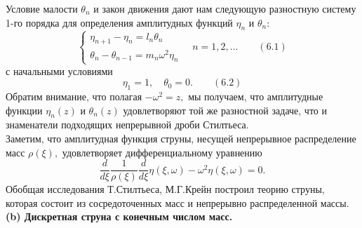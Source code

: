 \documentclass[12 pt, a4 paper]{article}
\theoremstyle{plain}   \newtheorem{Pro}{Задача}
\begin{document}
Условие малости
$ \theta _n $
и закон движения дают нам следующую разностную систему
1-го порядка для определения амплитудных функций
$ \eta _n $
и
$ \theta _n : $
\begin{equation*}
  \begin{cases}
    \eta _{n+1}-\eta _n =l_n \theta _n \\
	\theta _n -\theta _{n-1}=m_n \omega ^2 \eta _n
  \end{cases}
  \quad n=1,2,... \qquad (6.1)
\end{equation*}
с начальными условиями
$$
  \eta _1 =1, \quad \theta _0 =0 .
    \qquad (6.2)
$$
Обратим внимание, что полагая
$ -\omega ^2 =z, $
мы получаем, что амплитудные функции
$ \eta _n (z) $
и
$ \theta _n (z) $
удовлетворяют той же разностной задаче, что и знаменатели
подходящих непрерывной дроби Стилтьеса. \\
Заметим, что амплитудная функция струны, несущей
непрерывное распределение масс
$ \rho (\xi ) , $
удовлетворяет дифференциальному уравнению
$$
  \frac{d}{d\xi}\frac{1}{\rho (\xi )}
    \frac{d}{d\xi} \eta (\xi ,\omega )-
	  \omega ^2 \eta (\xi , \omega )=0.
$$
Обобщая исследования Т.Стилтьеса,
М.Г.Крейн построил теорию струны, которая состоит из
сосредоточенных масс и непрерывно распределенной массы.
$$ \; $$
{\bfseries (b) Дискретная струна с конечным числом масс.} \\
\end{document}
